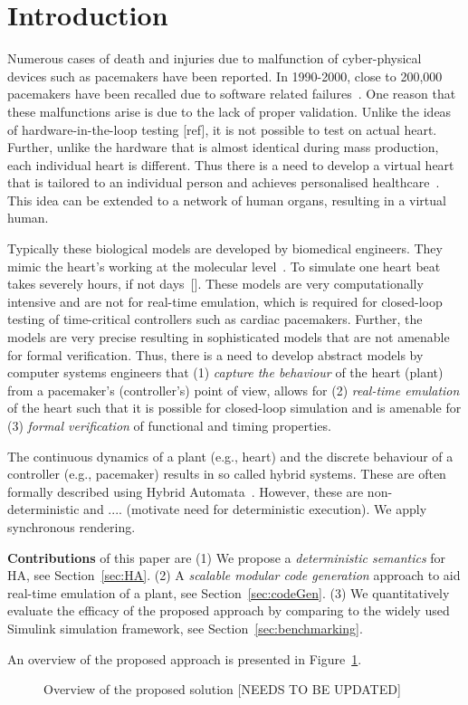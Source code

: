 \section{Introduction}

Numerous cases of death and injuries due to malfunction of 
cyber-physical devices such as  pacemakers have been reported.
In 1990-2000, close to 200,000 pacemakers have been recalled
due to software related failures~\cite{alemzadeh13}.
 One reason that these malfunctions
arise is due to the lack of proper validation.
Unlike the ideas of hardware-in-the-loop testing [ref],
it is not possible to test on actual heart.
Further, unlike the hardware that is almost identical 
during mass production, each individual heart is different.
Thus there is a need to develop a virtual heart that is tailored
to an individual person and achieves
 personalised healthcare~\cite{Trayanova2014}. This idea can be extended 
to a network of human organs, resulting in a virtual human.

Typically these biological  models are  developed by biomedical engineers.
They mimic the heart's working at the
molecular level~\cite{Trayanova2014}. 
To simulate one heart beat takes severely hours, if not days~[].
These models are very computationally intensive and 
are not for real-time emulation,
which is required for closed-loop testing of time-critical 
controllers such as cardiac pacemakers.
Further, the models are 
 very precise resulting in sophisticated models that 
 are not amenable for  formal verification. 
Thus, there is a need to develop abstract models 
by computer systems engineers that  
(1)  \emph{capture the behaviour} of the heart (plant) 
from a pacemaker's (controller's) point of view,
allows for (2) \emph{real-time emulation} of the heart 
such that it is possible for closed-loop simulation and
is amenable for (3) \emph{formal verification} of 
functional and timing properties.


The continuous dynamics of a plant (e.g., heart) and
 the discrete behaviour of a controller (e.g., pacemaker) 
 results in so called hybrid systems. 
 These are often formally described using Hybrid Automata~\cite{alur2015principles,raskin05,chen201487}.
 However, these are non-deterministic and ....
 (motivate need for deterministic execution).
 We apply synchronous rendering.
 
 \textbf{Contributions} of this paper are 
 (1) We propose a \emph{deterministic semantics} for \acf{HA}, see Section~\ref{sec:HA}.
 (2) A \emph{scalable modular code generation} approach 
 to aid real-time emulation of a plant, see Section~\ref{sec:codeGen}.
  (3) We quantitatively evaluate the efficacy of the 
  proposed approach by comparing  
   to the widely used Simulink\textsuperscript{\textregistered}
   simulation framework, see Section~\ref{sec:benchmarking}.
   
 An overview of the proposed approach is presented
 in Figure~\ref{fig:overview}.
 
 \begin{figure}[bthp]
 	\centering
 	\scalebox{0.7}{
	 
	}
	 \caption{Overview of the proposed solution 
	 	[NEEDS TO BE UPDATED] \label{fig:overview}}
\end{figure}
      
 
 
